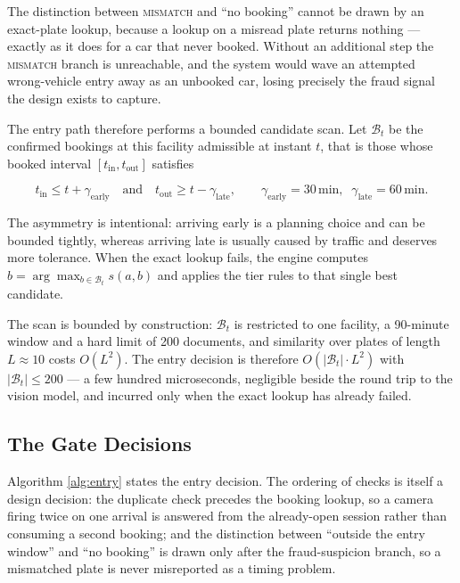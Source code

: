 \documentclass[journal,onecolumn,11pt]{IEEEtran}
\begin{document}
The distinction between \textsc{mismatch} and ``no booking'' cannot be drawn by
an exact-plate lookup, because a lookup on a misread plate returns nothing ---
exactly as it does for a car that never booked. Without an additional step the
\textsc{mismatch} branch is unreachable, and the system would wave an attempted
wrong-vehicle entry away as an unbooked car, losing precisely the fraud signal
the design exists to capture.

The entry path therefore performs a bounded candidate scan. Let $\mathcal{B}_t$
be the confirmed bookings at this facility admissible at instant $t$, that is
those whose booked interval $[t_{\text{in}}, t_{\text{out}}]$ satisfies

\begin{equation}
  t_{\text{in}} \leq t + \gamma_{\text{early}}
  \quad\text{and}\quad
  t_{\text{out}} \geq t - \gamma_{\text{late}},
  \qquad
  \gamma_{\text{early}} = 30\,\text{min},\;\;
  \gamma_{\text{late}} = 60\,\text{min}.
  \label{eq:window}
\end{equation}

The asymmetry is intentional: arriving early is a planning choice and can be
bounded tightly, whereas arriving late is usually caused by traffic and
deserves more tolerance. When the exact lookup fails, the engine computes
$\hat{b} = \arg\max_{b \in \mathcal{B}_t} s(a, b)$ and applies the tier rules to
that single best candidate.

The scan is bounded by construction: $\mathcal{B}_t$ is restricted to one
facility, a 90-minute window and a hard limit of 200 documents, and similarity
over plates of length $L \approx 10$ costs $O(L^2)$. The entry decision is
therefore $O(|\mathcal{B}_t| \cdot L^2)$ with $|\mathcal{B}_t| \leq 200$ --- a
few hundred microseconds, negligible beside the round trip to the vision model,
and incurred only when the exact lookup has already failed.

\subsection{The Gate Decisions}

Algorithm \ref{alg:entry} states the entry decision. The ordering of checks is
itself a design decision: the duplicate check precedes the booking lookup, so a
camera firing twice on one arrival is answered from the already-open session
rather than consuming a second booking; and the distinction between ``outside
the entry window'' and ``no booking'' is drawn only after the fraud-suspicion
branch, so a mismatched plate is never misreported as a timing problem.
\end{document}
